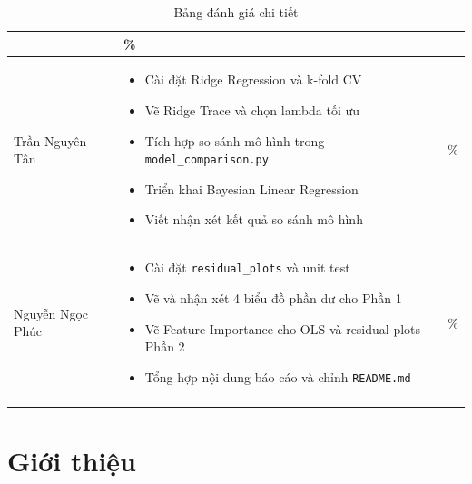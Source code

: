 \documentclass[a4paper]{article}
\begin{document}
\begin{longtable}{|>{\raggedright\arraybackslash}p{}|>{\raggedright\arraybackslash}p{}|>{\centering\arraybackslash}p{}|}
\begin{itemize}[leftmargin=*, noitemsep, topsep=0pt, partopsep=0pt]
                    \end{itemize} & 100\% \\ \hline
Trần Nguyên Tân   & \begin{itemize}[leftmargin=*, noitemsep, topsep=0pt, partopsep=0pt]
                        \item Cài đặt Ridge Regression và k-fold CV
                        \item Vẽ Ridge Trace và chọn lambda tối ưu
                        \item Tích hợp so sánh mô hình trong \texttt{model\_comparison.py}
                        \item Triển khai Bayesian Linear Regression
                        \item Viết nhận xét kết quả so sánh mô hình
                    \end{itemize} & 100\% \\ \hline
Nguyễn Ngọc Phúc     & \begin{itemize}[leftmargin=*, noitemsep, topsep=0pt, partopsep=0pt]
                        \item Cài đặt \texttt{residual\_plots} và unit test
                        \item Vẽ và nhận xét 4 biểu đồ phần dư cho Phần 1
                        \item Vẽ Feature Importance cho OLS và residual plots Phần 2
                        \item Tổng hợp nội dung báo cáo và chỉnh \texttt{README.md}
                    \end{itemize} & 100\% \\ \hline
\caption{Bảng đánh giá chi tiết}\\
\end{longtable}
\endgroup

\FloatBarrier


\section{Giới thiệu}
\end{document}
